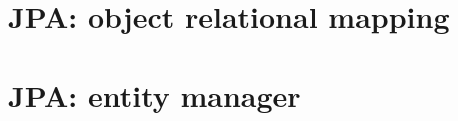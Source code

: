 \documentclass[12pt, a4paper]{report}
\newtheorem[style=M,bodystyle=\normalfont]{theorem}{Theorem}
\newtheorem[style=M,bodystyle=\normalfont]{corollary}{Corollary}
\newtheorem[style=M,bodystyle=\normalfont]{lemma}{Lemma}
\newtheorem[style=M,bodystyle=\normalfont]{definition}{Definition}
\begin{document}
    \section{JPA: object relational mapping}

    
    \section{JPA: entity manager}
    




    
\end{document}
